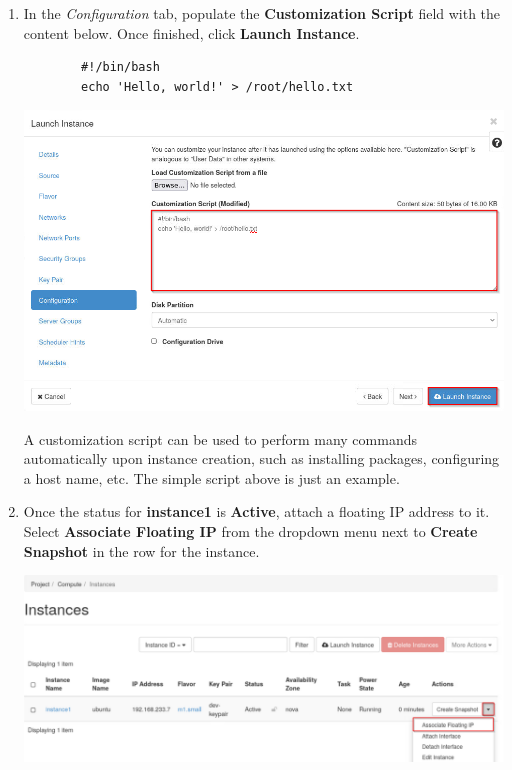 \documentclass[letterpaper, 12pt]{article}
\begin{document}
\begin{enumerate}
    \item In the \textit{Configuration} tab, populate the \textbf{Customization Script} field with the content below.
    Once finished, click \textbf{Launch Instance}.
    \begin{lstlisting}
        #!/bin/bash
        echo 'Hello, world!' > /root/hello.txt
    \end{lstlisting}

    \begin{center}
        \includegraphics[width=\linewidth]{images/part2/step10.png}
    \end{center}

    \begin{tipbox}
        A customization script can be used to perform many commands automatically upon instance creation, such as
        installing packages, configuring a host name, etc. The simple script above is just an example.
    \end{tipbox}

    \item Once the status for \textbf{instance1} is \textbf{Active}, attach a floating IP address to it. Select
    \textbf{Associate Floating IP} from the dropdown menu next to \textbf{Create Snapshot} in the row for the instance.

    \begin{center}
        \includegraphics[width=\linewidth]{images/part2/step11.png}
    \end{center}


\end{enumerate}
\end{document}
